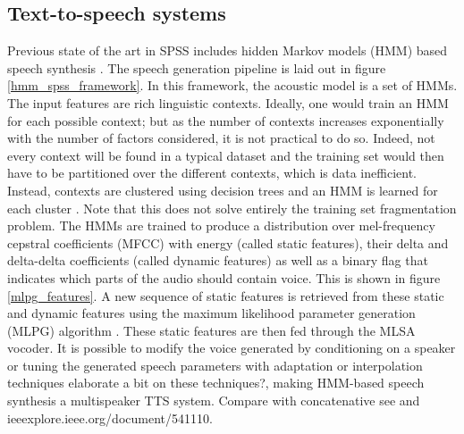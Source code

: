 \documentclass[a4paper, oneside]{article}
\begin{document}
\subsection{Text-to-speech systems}
Previous state of the art in SPSS includes hidden Markov models (HMM) based speech synthesis \citep{Tokuda-2013}. The speech generation pipeline is laid out in figure \ref{hmm_spss_framework}. In this framework, the acoustic model is a set of HMMs. The input features are rich linguistic contexts. Ideally, one would train an HMM for each possible context; but as the number of contexts increases exponentially with the number of factors considered, it is not practical to do so. Indeed, not every context will be found in a typical dataset and the training set would then have to be partitioned over the different contexts, which is data inefficient. Instead, contexts are clustered using decision trees and an HMM is learned for each cluster \citep{HMMTTS}. Note that this does not solve entirely the training set fragmentation problem. The HMMs are trained to produce a distribution over mel-frequency cepstral coefficients (MFCC) with energy (called static features), their delta and delta-delta coefficients (called dynamic features) as well as a binary flag that indicates which parts of the audio should contain voice. This is shown in figure \ref{mlpg_features}. A new sequence of static features is retrieved from these static and dynamic features using the maximum likelihood parameter generation (MLPG) algorithm \citep{Tokuda-2000}. These static features are then fed through the MLSA vocoder\citep{MLSA}. It is possible to modify the voice generated by conditioning on a speaker or tuning the generated speech parameters with adaptation or interpolation techniques \citep{HMMSpeakerInterpolation} \color{red} elaborate a bit on these techniques?\color{black}, making HMM-based speech synthesis a multispeaker TTS system. \color{red} Compare with concatenative see \citep{SPSSDNN} and ieeexplore.ieee.org/document/541110.\color{black}
\end{document}
